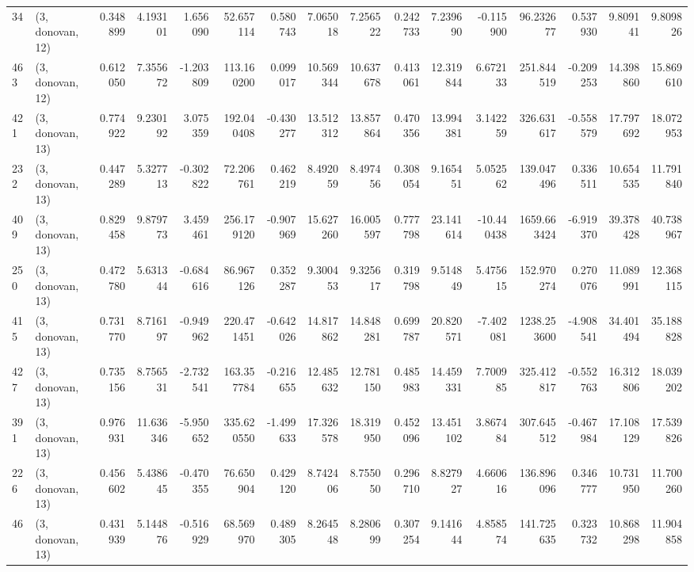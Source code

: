 \begin{tabular}{llrrrrrrrrrrrrrr}
34  &  (3, donovan, 12) &   0.348899 &   4.193101 &   1.656090 &    52.657114 &   0.580743 &   7.065018 &   7.256522 &  0.242733 &   7.239690 &  -0.115900 &     96.232677 &    0.537930 &    9.809141 &    9.809826 \\
463 &  (3, donovan, 12) &   0.612050 &   7.355672 &  -1.203809 &   113.160200 &   0.099017 &  10.569344 &  10.637678 &  0.413061 &  12.319844 &   6.672133 &    251.844519 &   -0.209253 &   14.398860 &   15.869610 \\
421 &  (3, donovan, 13) &   0.774922 &   9.230192 &   3.075359 &   192.040408 &  -0.430277 &  13.512312 &  13.857864 &  0.470356 &  13.994381 &   3.142259 &    326.631617 &   -0.558579 &   17.797692 &   18.072953 \\
232 &  (3, donovan, 13) &   0.447289 &   5.327713 &  -0.302822 &    72.206761 &   0.462219 &   8.492059 &   8.497456 &  0.308054 &   9.165451 &   5.052562 &    139.047496 &    0.336511 &   10.654535 &   11.791840 \\
409 &  (3, donovan, 13) &   0.829458 &   9.879773 &   3.459461 &   256.179120 &  -0.907969 &  15.627260 &  16.005597 &  0.777798 &  23.141614 & -10.440438 &   1659.663424 &   -6.919370 &   39.378428 &   40.738967 \\
250 &  (3, donovan, 13) &   0.472780 &   5.631344 &  -0.684616 &    86.967126 &   0.352287 &   9.300453 &   9.325617 &  0.319798 &   9.514849 &   5.475615 &    152.970274 &    0.270076 &   11.089991 &   12.368115 \\
415 &  (3, donovan, 13) &   0.731770 &   8.716197 &  -0.949962 &   220.471451 &  -0.642026 &  14.817862 &  14.848281 &  0.699787 &  20.820571 &  -7.402081 &   1238.253600 &   -4.908541 &   34.401494 &   35.188828 \\
427 &  (3, donovan, 13) &   0.735156 &   8.756531 &  -2.732541 &   163.357784 &  -0.216655 &  12.485632 &  12.781150 &  0.485983 &  14.459331 &   7.700985 &    325.412817 &   -0.552763 &   16.312806 &   18.039202 \\
391 &  (3, donovan, 13) &   0.976931 &  11.636346 &  -5.950652 &   335.620550 &  -1.499633 &  17.326578 &  18.319950 &  0.452096 &  13.451102 &   3.867484 &    307.645512 &   -0.467984 &   17.108129 &   17.539826 \\
226 &  (3, donovan, 13) &   0.456602 &   5.438645 &  -0.470355 &    76.650904 &   0.429120 &   8.742406 &   8.755050 &  0.296710 &   8.827927 &   4.660616 &    136.896096 &    0.346777 &   10.731950 &   11.700260 \\
46  &  (3, donovan, 13) &   0.431939 &   5.144876 &  -0.516929 &    68.569970 &   0.489305 &   8.264548 &   8.280699 &  0.307254 &   9.141644 &   4.858574 &    141.725635 &    0.323732 &   10.868298 &   11.904858 \\

\end{tabular}

